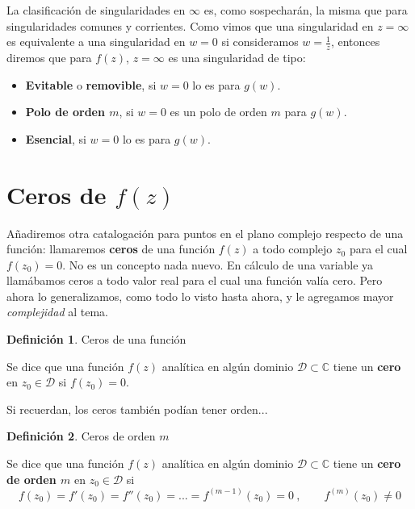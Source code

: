 \documentclass[12pt]{article}
\theoremstyle{definition}
\newtheorem{definition}{Definici\'on}[section]
\theoremstyle{theorem}
\theoremstyle{corolary}
\theoremstyle{method}
\begin{document}
La clasificaci\'on de singularidades en $\infty$ es, como sospechar\'an, la misma que para singularidades comunes y corrientes. Como vimos que una singularidad en $z=\infty$ es equivalente a una singularidad en $w=0$ si consideramos $w=\frac{1}{z}$, entonces diremos que para $f(z)$, $z=\infty$ es una singularidad de tipo:
\begin{itemize}
	\item \textbf{Evitable} o \textbf{removible}, si $w=0$ lo es para $g(w)$.
	\item \textbf{Polo de orden $m$}, si $w=0$ es un polo de orden $m$ para $g(w)$.
	\item \textbf{Esencial}, si $w=0$ lo es para $g(w)$.
\end{itemize}

\section{Ceros de $f(z)$}
A\~nadiremos otra catalogaci\'on para puntos en el plano complejo respecto de una funci\'on: llamaremos \textbf{ceros} de una funci\'on $f(z)$ a todo complejo $z_0$ para el cual $f(z_0)=0$. No es un concepto nada nuevo. En c\'alculo de una variable ya llam\'abamos ceros a todo valor real para el cual una funci\'on val\'ia cero. Pero ahora lo generalizamos, como todo lo visto hasta ahora, y le agregamos mayor \textit{complejidad} al tema. \\

\colorbox{orange!40!white!80}{\parbox{\linewidth}{
\theoremstyle{definition}
\begin{definition}{Ceros de una funci\'on}

Se dice que una funci\'on $f(z)$ anal\'itica en alg\'un dominio $\mathcal{D}\subset \mathbb{C}$ tiene un \textbf{cero} en $z_0\in \mathcal{D}$ si $f(z_0)=0$.
\end{definition}}}
\linebreak
\linebreak

Si recuerdan, los ceros tambi\'en pod\'ian tener orden...\\

\colorbox{orange!40!white!80}{\parbox{\linewidth}{
\theoremstyle{definition}
\begin{definition}{Ceros de orden $m$}

Se dice que una funci\'on $f(z)$ anal\'itica en alg\'un dominio $\mathcal{D}\subset \mathbb{C}$ tiene un \textbf{cero de orden $m$} en $z_0\in \mathcal{D}$ si $$f(z_0)=f'(z_0)=f''(z_0)=...=f^{(m-1)}(z_0)=0\ ,\qquad f^{(m)}(z_0)\neq 0$$
\end{definition}}}
\linebreak
\linebreak
\end{document}
